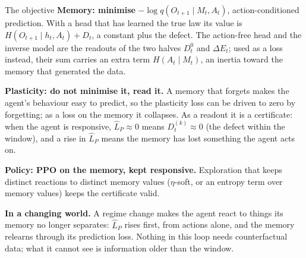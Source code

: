 \documentclass[11pt,aspectratio=169]{beamer}
\begin{document}
\begin{frame}[shrink=8]{The objective}
\textbf{Memory: minimise} $-\log q(O_{t+1} \mid M_t, A_t)$, action-conditioned prediction. With a head that has learned the true law its value is $H(O_{t+1} \mid h_t, A_t) + D_t$, a constant plus the defect. The action-free head and the inverse model are the readouts of the two halves $D^0_t$ and $\Delta E_t$; used as a loss instead, their sum carries an extra term $H(A_t \mid M_t)$, an inertia toward the memory that generated the data.

\medskip
\textbf{Plasticity: do not minimise it, read it.} A memory that forgets makes the agent's behaviour easy to predict, so the plasticity loss can be driven to zero by forgetting; as a loss on the memory it collapses. As a readout it is a certificate: when the agent is responsive, $\hat L_P \approx 0$ means $D^{(k)}_t \approx 0$ (the defect within the window), and a rise in $\hat L_P$ means the memory has lost something the agent acts on.

\medskip
\textbf{Policy: PPO on the memory, kept responsive.} Exploration that keeps distinct reactions to distinct memory values ($\eta$-soft, or an entropy term over memory values) keeps the certificate valid.

\medskip
\textbf{In a changing world.} A regime change makes the agent react to things its memory no longer separates: $\hat L_P$ rises first, from actions alone, and the memory relearns through its prediction loss. Nothing in this loop needs counterfactual data; what it cannot see is information older than the window.
\end{frame}
\end{document}
